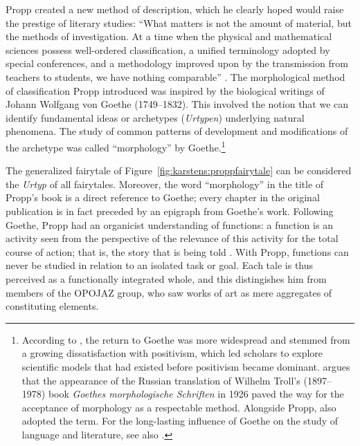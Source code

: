 \documentclass[output=paper]{langscibook}
\begin{document}
Propp created a new method of description, which he clearly hoped would raise the prestige of literary studies: ``What matters is not the amount of material, but the methods of investigation. At a time when the physical and mathematical sciences possess well-ordered classification, a unified terminology adopted by special conferences, and a methodology improved upon by the transmission from teachers to students, we have nothing comparable'' \citep[4]{Propp1968}. The morphological method of classification Propp introduced was inspired by the biological writings of Johann Wolfgang von Goethe (1749--1832). This involved the notion that we can identify fundamental ideas or archetypes (\emph{Urtypen}) underlying natural phenomena. The study of common patterns of development and modifications of the archetype was called ``morphology'' by Goethe.\footnote{According to \citet[257--258]{Steiner1984}, the return to Goethe was more widespread and stemmed from a growing dissatisfaction with positivism, which led scholars to explore scientific models that had existed before positivism became dominant. \citet[13]{Oppel1947} argues that the appearance of the Russian translation of Wilhelm Troll's (1897--1978) book \emph{Goethes morphologische Schriften} in 1926 paved the way for the acceptance of morphology as a respectable method. Alongside Propp, \citet{Petrovskij1927} also adopted the term. For the long-lasting influence of Goethe on the study of language and literature, see also \citet{Cassirer1945}.}

The generalized fairytale of Figure~\ref{fig:karstens:proppfairytale} can be considered the \emph{Urtyp} of all fairytales. Moreover, the word ``morphology'' in the title of Propp's book is a direct reference to Goethe; every chapter in the original publication is in fact preceded by an epigraph from Goethe's work. Following Goethe, Propp had an organicist understanding of functions: a function is an activity seen from the perspective of the relevance of this activity for the total course of action; that is, the story that is being told \citep[84]{Steiner1984}. With Propp, functions can never be studied in relation to an isolated task or goal. Each tale is thus perceived as a functionally integrated whole, and this distingishes him from members of the OPOJAZ group, who saw works of art as mere aggregates of constituting elements.
\end{document}
